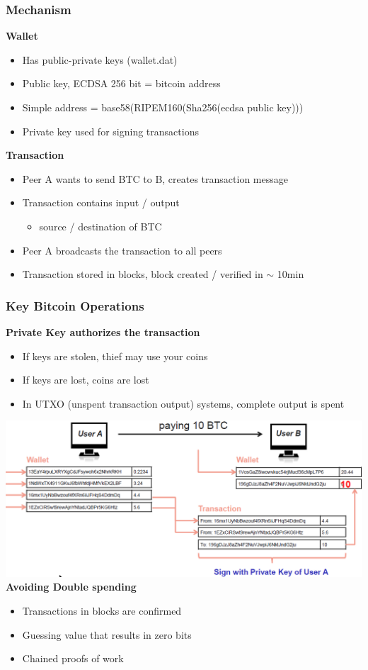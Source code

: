 \subsubsection{Mechanism}
\textbf{Wallet}
\begin{itemize}
    \item Has public-private keys (wallet.dat)
    \item Public key, ECDSA 256 bit = bitcoin address
    \item Simple address = base58(RIPEM160(Sha256(ecdsa public key)))
    \item Private key used for signing transactions
\end{itemize}
\textbf{Transaction}
\begin{itemize}
    \item Peer A wants to send BTC to B, creates transaction message
    \item Transaction contains input / output
    \begin{itemize}
        \item source / destination of BTC
    \end{itemize}
    \item Peer A broadcasts the transaction to all peers
    \item Transaction stored in blocks, block created / verified in $\sim$ 10min
\end{itemize}

\subsubsection{Key Bitcoin Operations}
\textbf{Private Key authorizes the transaction}
\begin{itemize}
    \item If keys are stolen, thief may use your coins
    \item If keys are lost, coins are lost
    \item In UTXO (unspent transaction output) systems, complete output is spent
\end{itemize}
\includegraphics[width=\linewidth]{../img/bitcoin_transaction.png}
\textbf{Avoiding Double spending}
\begin{itemize}
    \item Transactions in blocks are confirmed
    \item Guessing value that results in zero bits
    \item Chained proofs of work
\end{itemize}

